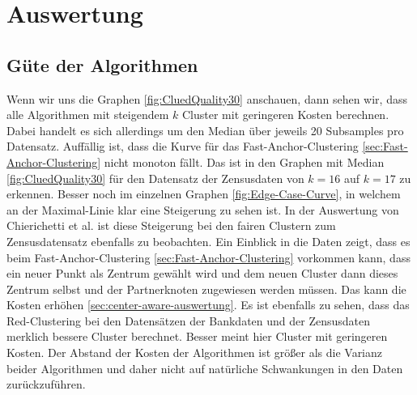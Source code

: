 
\chapter{Auswertung} \label{chap:Auswertung}


\section{Güte der Algorithmen}
    Wenn wir uns die Graphen \ref{fig:CluedQuality30} anschauen, dann sehen wir, dass alle Algorithmen mit steigendem $k$ Cluster mit geringeren Kosten berechnen. Dabei handelt es sich allerdings um den Median über jeweils 20 Subsamples pro Datensatz. Auffällig ist, dass die Kurve für das Fast-Anchor-Clustering \ref{sec:Fast-Anchor-Clustering} nicht monoton fällt. Das ist in den Graphen mit Median \ref{fig:CluedQuality30} für den Datensatz der Zensusdaten \cite{misc_adult_2} von $k = 16$ auf $k = 17$ zu erkennen. Besser noch im einzelnen Graphen \ref{fig:Edge-Case-Curve}, in welchem an der Maximal-Linie klar eine Steigerung zu sehen ist. In der Auswertung von Chierichetti et al. \cite{chierichetti2018fair} ist diese Steigerung bei den fairen Clustern zum Zensusdatensatz \cite{misc_adult_2} ebenfalls zu beobachten. Ein Einblick in die Daten zeigt, dass es beim Fast-Anchor-Clustering \ref{sec:Fast-Anchor-Clustering} vorkommen kann, dass ein neuer Punkt als Zentrum gewählt wird und dem neuen Cluster dann dieses Zentrum selbst und der Partnerknoten zugewiesen werden müssen. Das kann die Kosten erhöhen \ref{sec:center-aware-auswertung}. \newline
    Es ist ebenfalls zu sehen, dass das Red-Clustering bei den Datensätzen der Bankdaten \cite{misc_bank_marketing_222} und der Zensusdaten \cite{misc_adult_2} merklich bessere Cluster berechnet. Besser meint hier Cluster mit geringeren Kosten. Der Abstand der Kosten der Algorithmen ist größer als die Varianz beider Algorithmen und daher nicht auf natürliche Schwankungen in den Daten zurückzuführen.
